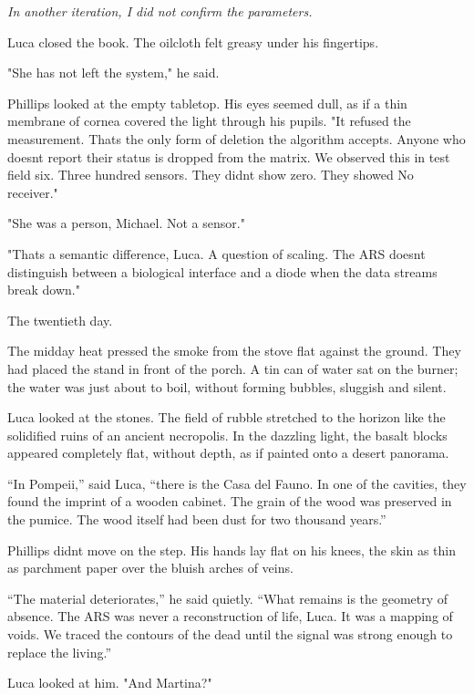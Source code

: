 \documentclass[
  ngerman,
]{article}
\begin{document}
\emph{In another iteration, I did not confirm the parameters.}

Luca closed the book. The oilcloth felt greasy under his fingertips.

"She has not left the system," he said.

Phillips looked at the empty tabletop. His eyes seemed dull, as if a
thin membrane of cornea covered the light through his pupils. "It
refused the measurement. That\textquotesingle s the only form of
deletion the algorithm accepts. Anyone who doesn\textquotesingle t
report their status is dropped from the matrix. We observed this in test
field six. Three hundred sensors. They didn\textquotesingle t show
\textquotesingle zero.\textquotesingle{} They showed \textquotesingle No
receiver.\textquotesingle"

"She was a person, Michael. Not a sensor."

"That\textquotesingle s a semantic difference, Luca. A question of
scaling. The ARS doesn\textquotesingle t distinguish between a
biological interface and a diode when the data streams break down."

The twentieth day.

The midday heat pressed the smoke from the stove flat against the
ground. They had placed the stand in front of the porch. A tin can of
water sat on the burner; the water was just about to boil, without
forming bubbles, sluggish and silent.

Luca looked at the stones. The field of rubble stretched to the horizon
like the solidified ruins of an ancient necropolis. In the dazzling
light, the basalt blocks appeared completely flat, without depth, as if
painted onto a desert panorama.

``In Pompeii,'' said Luca, ``there is the Casa del Fauno. In one of the
cavities, they found the imprint of a wooden cabinet. The grain of the
wood was preserved in the pumice. The wood itself had been dust for two
thousand years.''

Phillips didn\textquotesingle t move on the step. His hands lay flat on
his knees, the skin as thin as parchment paper over the bluish arches of
veins.

``The material deteriorates,'' he said quietly. ``What remains is the
geometry of absence. The ARS was never a reconstruction of life, Luca.
It was a mapping of voids. We traced the contours of the dead until the
signal was strong enough to replace the living.''

Luca looked at him. "And Martina?"
\end{document}
